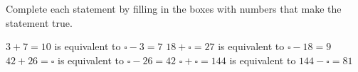 \begin{exercises}
\begin{questions}
\begin{multicols}{3}
        \end{multicols}
        \question Complete each statement by filling in the boxes with numbers that make the statement true.
        \begin{parts}
            \Part[1] \(3+7=10\) is equivalent to \(\square-3=7\)
            \Part[1] \(18+\square=27\) is equivalent to \(\square-18=9\)
            \Part[1] \(42+26=\square\) is equivalent to \(\square-26=42\)
            \Part[1] \(\square+\square=144\) is equivalent to \(144-\square=81\)
        \end{parts}
    \end{questions}
\end{exercises}
